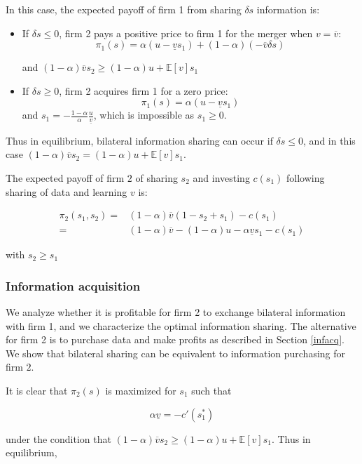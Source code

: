 \documentclass[a4paper,leqno]{article}%
\newcommand{\E}{\mathbb E}
\renewcommand{\a}{\alpha}
\newcommand{\uv}{\underline{v}}
\newcommand{\ov}{\overline{v}}
\begin{document}
In this case, the expected payoff of firm 1 from sharing $\delta s$ information is:

\begin{itemize}
    \item If $\delta s\leq 0$, firm 2 pays a positive price to firm 1 for the merger when $v=\ov$:
    $$\pi_1(s)=\a(u-\uv s_1)+(1-\a)(-\ov \delta s)$$
    
    and $(1-\a)\ov s_2 \geq (1-\a)u+\E[v]s_1$
    \item If $\delta s\geq 0$, firm 2 acquires firm 1 for a zero price:
    $$\pi_1(s)=\a(u-\uv s_1)$$
    and $s_1=-\frac{1-\a}{\a}\frac{u}{\uv}$, which is impossible as $s_1 \geq 0$.
\end{itemize}

Thus in equilibrium, bilateral information sharing can occur if $\delta s\leq0$, and in this case $(1-\a)\ov s_2 = (1-\a)u+\E[v]s_1$.

The expected payoff of firm $2$ of sharing $s_2$ and investing $c(s_1)$ following sharing of data and learning $v$ is:

\begin{equation}
    \begin{aligned}
    \pi_2(s_1,s_2)=&(1-\a)\ov(1-s_2+s_1)-c(s_1)\\
                =&(1-\a)\ov-(1-\a)u-\a \uv s_1-c(s_1)
    \end{aligned}
\end{equation}


with $s_2\geq s_1$

\medskip

\subsubsection{Information acquisition}

We analyze whether it is profitable for firm 2 to exchange bilateral information with firm 1, and we characterize the optimal information sharing. The alternative for firm 2 is to purchase data and make profits as described in Section \ref{infacq}. We show that bilateral sharing can be equivalent to information purchasing for firm $2$. 

\medskip

It is clear that $\pi_2(s)$ is maximized for $s_1$ such that 

$$\a \uv =-c'(s_1^*)$$

under the condition that $(1-\a)\ov s_2 \geq (1-\a)u+\E[v]s_1$. Thus in equilibrium, 
\end{document}
